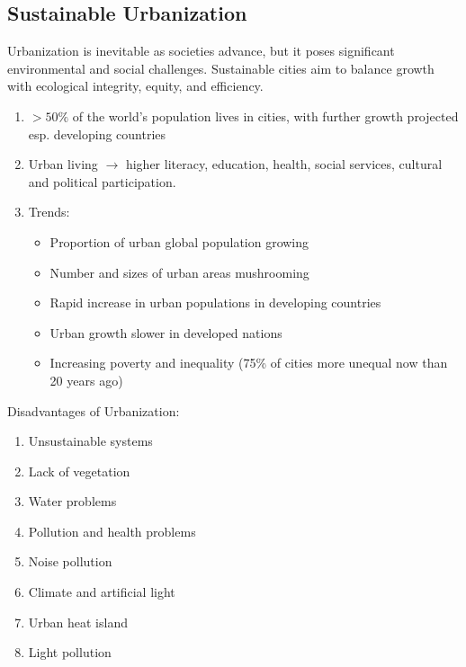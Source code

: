 \documentclass[12pt, a4paper]{article}
\begin{document}
\begin{multicols*}{3}
\section{Sustainable Urbanization}

Urbanization is inevitable as societies advance, but it poses significant environmental and social challenges. Sustainable cities aim to balance growth with ecological integrity, equity, and efficiency.  
\begin{enumerate}[\roman*.]
  \item $>50\%$ of the world's population lives in cities, with further growth projected esp. developing countries
  \item Urban living $\rightarrow$ higher literacy, education, health, social services, cultural and political participation.
  \item Trends:\vspace{2pt}
    \begin{itemize}[leftmargin=*]
      \item Proportion of urban global population growing
      \item Number and sizes of urban areas mushrooming
      \item Rapid increase in urban populations in developing countries
      \item Urban growth slower in developed nations
      \item Increasing poverty and inequality (75\% of cities more unequal now than 20 years ago)
    \end{itemize}
\end{enumerate}

Disadvantages of Urbanization:
\begin{enumerate}[\roman*.]
  \item Unsustainable systems
  \item Lack of vegetation
  \item Water problems 
  \item Pollution and health problems 
  \item Noise pollution 
  \item Climate and artificial light 
  \item Urban heat island
  \item Light pollution
\end{enumerate}


\end{multicols*}
\end{document}
